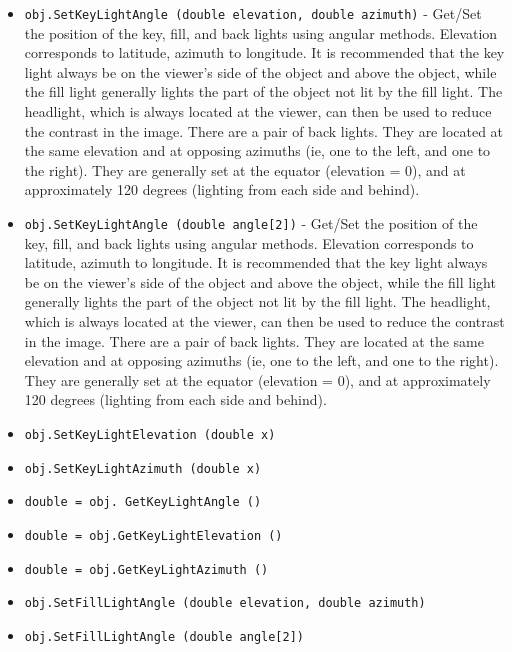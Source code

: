 \begin{itemize}
\item  \verb|obj.SetKeyLightAngle (double elevation, double azimuth)| -  Get/Set the position of the key, fill, and back lights
 using angular methods.  Elevation corresponds to latitude,
 azimuth to longitude.  It is recommended that the key light
 always be on the viewer's side of the object and above the
 object, while the fill light generally lights the part of the object
 not lit by the fill light.  The headlight, which is always located
 at the viewer, can then be used to reduce the contrast in the image.
 There are a pair of back lights.  They are located at the same
 elevation and at opposing azimuths (ie, one to the left, and one to
 the right).  They are generally set at the equator (elevation = 0),
 and at approximately 120 degrees (lighting from each side and behind).

\item  \verb|obj.SetKeyLightAngle (double angle[2])| -  Get/Set the position of the key, fill, and back lights
 using angular methods.  Elevation corresponds to latitude,
 azimuth to longitude.  It is recommended that the key light
 always be on the viewer's side of the object and above the
 object, while the fill light generally lights the part of the object
 not lit by the fill light.  The headlight, which is always located
 at the viewer, can then be used to reduce the contrast in the image.
 There are a pair of back lights.  They are located at the same
 elevation and at opposing azimuths (ie, one to the left, and one to
 the right).  They are generally set at the equator (elevation = 0),
 and at approximately 120 degrees (lighting from each side and behind).

\item  \verb|obj.SetKeyLightElevation (double x)|

\item  \verb|obj.SetKeyLightAzimuth (double x)|

\item  \verb|double = obj. GetKeyLightAngle ()|

\item  \verb|double = obj.GetKeyLightElevation ()|

\item  \verb|double = obj.GetKeyLightAzimuth ()|

\item  \verb|obj.SetFillLightAngle (double elevation, double azimuth)|

\item  \verb|obj.SetFillLightAngle (double angle[2])|


\end{itemize}
